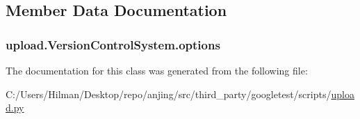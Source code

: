 \subsection{Member Data Documentation}
\hypertarget{classupload_1_1_version_control_system_a4d57d043bc408887b94269fe4cea9556}{}
\subsubsection[{options}]{\setlength{\rightskip}{0pt plus 5cm}upload.\+Version\+Control\+System.\+options}\label{classupload_1_1_version_control_system_a4d57d043bc408887b94269fe4cea9556}


The documentation for this class was generated from the following file\+:\begin{DoxyCompactItemize}
\item 
C\+:/\+Users/\+Hilman/\+Desktop/repo/anjing/src/third\+\_\+party/googletest/scripts/\hyperlink{upload_8py}{upload.\+py}\end{DoxyCompactItemize}
